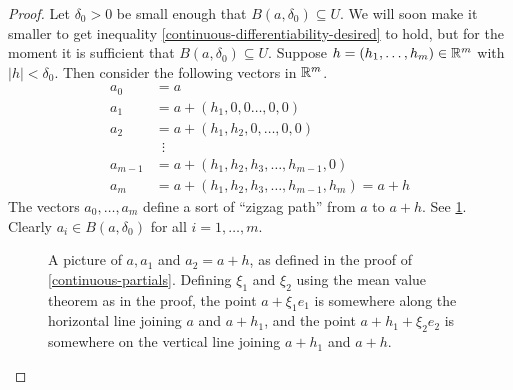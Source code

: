 \begin{proof}[Proof]
	Let $\delta_0 > 0$ be small enough that $B(a, \delta_0) \subseteq U$. We will soon make it smaller to get inequality \eqref{continuous-differentiability-desired} to hold, but for the moment it is sufficient that $B(a, \delta_0) \subseteq U$. 
	Suppose $h = (h_1, \dotsc, h_m) \in \mathbb{R}^m$ with $|h| < \delta_0$. Then consider the following vectors in $\mathbb{R}^m$. 
	\[ \begin{aligned} 
	a_0 &= a \\
	a_1 &= a + (h_1, 0, 0 \dotsc, 0, 0) \\
	a_2 &= a + (h_1, h_2, 0, \dotsc, 0, 0) \\
	&\enspace \vdots \\
	a_{m-1} &= a + (h_1, h_2, h_3, \dotsc, h_{m-1}, 0) \\
	a_m &= a + (h_1, h_2, h_3, \dotsc, h_{m-1}, h_m) = a + h \end{aligned} \]
	The vectors $a_0, \dotsc, a_m$ define a sort of ``zigzag path'' from $a$ to $a + h$. See \cref{continuous-differentiability-picture}. Clearly $a_i \in B(a, \delta_0)$ for all $i = 1, \dotsc, m$. 
	\begin{figure}
		\begin{center}
		\end{center}
		\caption{A picture of $a, a_1$ and $a_2 = a + h$, as defined in the proof of \cref{continuous-partials}. Defining $\xi_1$ and $\xi_2$ using the mean value theorem as in the proof, the point $a + \xi_1e_1$ is somewhere along the horizontal line joining $a$ and $a+h_1$, and the point $a+h_1 + \xi_2e_2$ is somewhere on the vertical line joining $a+h_1$ and $a+h$.}  \label{continuous-differentiability-picture}
	\end{figure}
	

\end{proof}
